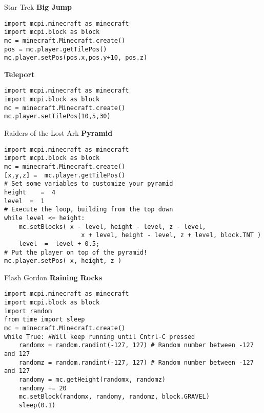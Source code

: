 \documentclass[flashcard_land,grid]{flashcards}
\begin{document}
\begin{flashcard}[API]{Star Trek}
{\bf Big Jump}
\begin{lstlisting}
import mcpi.minecraft as minecraft
import mcpi.block as block
mc = minecraft.Minecraft.create()
pos = mc.player.getTilePos()
mc.player.setPos(pos.x,pos.y+10, pos.z) 
\end{lstlisting}

{\bf Teleport}
\begin{lstlisting}
import mcpi.minecraft as minecraft
import mcpi.block as block
mc = minecraft.Minecraft.create()
mc.player.setTilePos(10,5,30)
\end{lstlisting}
\end{flashcard}


\begin{flashcard}[API]{Raiders of the Lost Ark}
{\bf Pyramid}
\begin{lstlisting}
import mcpi.minecraft as minecraft
import mcpi.block as block
mc = minecraft.Minecraft.create()
[x,y,z] =  mc.player.getTilePos()
# Set some variables to customize your pyramid
height    =  4
level  =  1
# Execute the loop, building from the top down
while level <= height:
	mc.setBlocks( x - level, height - level, z - level,
	                 x + level, height - level, z + level, block.TNT )
	level  =  level + 0.5;
# Put the player on top of the pyramid!
mc.player.setPos( x, height, z )
\end{lstlisting}
\end{flashcard}

\begin{flashcard}[API]{Flash Gordon}
{\bf Raining Rocks}
\begin{lstlisting}
import mcpi.minecraft as minecraft
import mcpi.block as block
import random
from time import sleep
mc = minecraft.Minecraft.create()
while True: #Will keep running until Cntrl-C pressed
    randomx = random.randint(-127, 127) # Random number between -127 and 127
    randomz = random.randint(-127, 127) # Random number between -127 and 127
    randomy = mc.getHeight(randomx, randomz)
    randomy += 20
    mc.setBlock(randomx, randomy, randomz, block.GRAVEL)
    sleep(0.1)
\end{lstlisting}
\end{flashcard}
\end{document}
